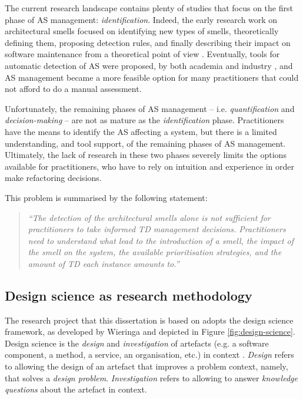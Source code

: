 The current research landscape contains plenty of studies that focus on the first phase of AS management: \emph{identification}.
Indeed, the early research work on architectural smells focused on identifying new types of smells, theoretically defining them, proposing detection rules, and finally describing their impact on software maintenance from a theoretical point of view \cite{Lippert2006,Garcia2009,Mo2015,Le2016,Arcelli2016}.
Eventually, tools for automatic detection of AS were proposed, by both academia and industry \cite{Avgeriou2021,Khomyakov2020}, and AS management became a more feasible option for many practitioners that could not afford to do a manual assessment.

Unfortunately, the remaining phases of AS management -- i.e. \emph{quantification} and \emph{decision-making} -- are not as mature as the \emph{identification} phase.
Practitioners have the means to identify the AS affecting a system, but there is a limited understanding, and tool support, of the remaining phases of AS management.
Ultimately, the lack of research in these two phases severely limits the options available for practitioners, who have to rely on intuition and experience in order make refactoring decisions.

This problem is summarised by the following statement:
\begin{quote}\itshape
    ``The detection of the architectural smells alone is not sufficient for practitioners to take informed TD management decisions.
    Practitioners need to understand what lead to the introduction of a smell, the impact of the smell on the system, the available prioritisation strategies, and the amount of TD each instance amounts to.''
\end{quote}

\subsection{Design science as research methodology}
The research project that this dissertation is based on adopts the design science framework, as developed by Wieringa \cite{Wieringa2014} and depicted in Figure \ref{fig:design-science}.
Design science is the \emph{design} and \emph{investigation} of artefacts (e.g. a software component, a method, a service, an organisation, etc.) in context \cite{Wieringa2014}.
\emph{Design} refers to allowing the design of an artefact that improves a problem context, namely, that solves a \emph{design problem}. 
\emph{Investigation} refers to allowing to answer \emph{knowledge questions} about the artefact in context.

